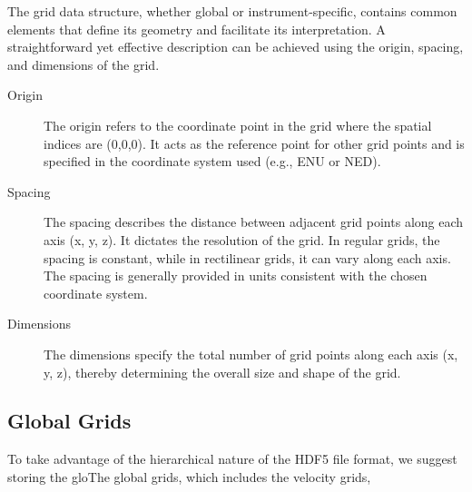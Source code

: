 The grid data structure, whether global or instrument-specific, contains common elements that define its geometry and facilitate its interpretation. A straightforward yet effective description can be achieved using the origin, spacing, and dimensions of the grid.

\begin{description}
    \item[Origin] The origin refers to the coordinate point in the grid where the spatial indices are (0,0,0). It acts as the reference point for other grid points and is specified in the coordinate system used (e.g., ENU or NED).
    
    \item[Spacing] The spacing describes the distance between adjacent grid points along each axis (x, y, z). It dictates the resolution of the grid. In regular grids, the spacing is constant, while in rectilinear grids, it can vary along each axis. The spacing is generally provided in units consistent with the chosen coordinate system.
    
    \item[Dimensions] The dimensions specify the total number of grid points along each axis (x, y, z), thereby determining the overall size and shape of the grid.
\end{description}


\subsection{Global Grids}

To take advantage of the hierarchical nature of the HDF5 file format, we suggest storing the gloThe global grids, which includes the velocity grids, 

